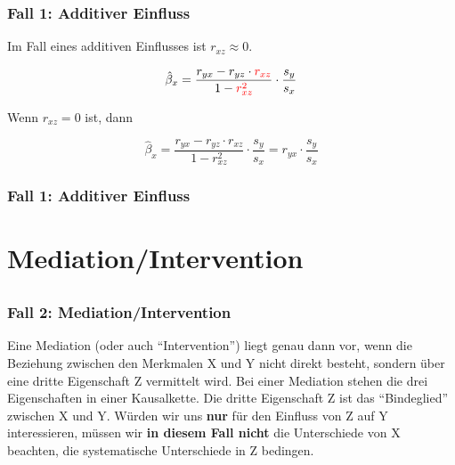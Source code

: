\documentclass[18pt, aspectratio=169]{beamer}
\begin{document}
\begin{frame}
\frametitle{Fall 1: Additiver Einfluss}

Im Fall eines additiven Einflusses ist $r_{xz} \approx 0$.

\begin{equation*}
\hat{\beta}_x=\frac{r_{y{x}}-r_{y{z}}\cdot \textcolor{red}{r_{{x}{z}}}}{1-\textcolor{red}{r_{{x}{z}}^2}}\cdot\frac{s_y}{s_{x}}
\end{equation*}



Wenn $r_{xz} = 0$ ist, dann 

\begin{equation*}
\hat{\beta}_x=\frac{r_{y{x}}-r_{y{z}}\cdot r_{{x}{z}}}{1-r_{{x}{z}}^2}\cdot\frac{s_y}{s_{x}} = r_{yx} \cdot \frac{s_y}{s_{x}} 
\end{equation*}

\end{frame}

\begin{frame}
\frametitle{Fall 1: Additiver Einfluss}

\begin{center}

\end{center}

\end{frame}

\section{Mediation/Intervention}
\subsection*{}

\begin{frame}
\frametitle{Fall 2: Mediation/Intervention}
\begin{figure}
\centering
{}
\end{figure}

{{ \scriptsize Eine Mediation (oder auch "`Intervention"') liegt genau dann vor, wenn die Beziehung zwischen den Merkmalen X und Y nicht direkt besteht, sondern über eine dritte Eigenschaft Z vermittelt wird.  Bei einer Mediation stehen die drei Eigenschaften in einer Kausalkette. Die dritte Eigenschaft Z ist das "`Bindeglied"' zwischen X und Y. Würden wir uns \textbf{nur} für den Einfluss von Z auf Y interessieren, müssen wir \textbf{in diesem Fall nicht} die Unterschiede von X beachten, die systematische Unterschiede in Z bedingen. }}

\end{frame}
\end{document}

